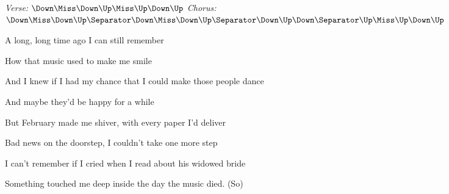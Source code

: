 \begin{song}


\begin{headerbox}
\textit{Verse:} $\Down\Miss\Down\Up\Miss\Up\Down\Up$ \quad
\textit{Chorus:} $\Down\Miss\Down\Up \Separator \Down\Miss\Down\Up \Separator \Down\Up\Down \Separator \Up\Miss\Up\Down\Up$ \quad
\end{headerbox}

\begin{vchordbox}
\smaller
\raggedleft
{} \par
{} \par
{} \par
{} \par
{} \par
\vspace{-5em}
\end{vchordbox}

\normalsize

\bigskip

 \par
A long, long time ago  I can still remember \par
How that music used to make me smile \par
And I knew if I had my chance that I could make those people dance \par
And maybe they'd be happy for a while \par

\bigskip

But February made me shiver, with every paper I'd deliver \par
{}Bad news on the doorstep, I couldn't take one more step \par
I can't remember if I cried when I read about his widowed bride \par
{}Something touched me deep inside the day the music died. (So) \par


\end{song}
